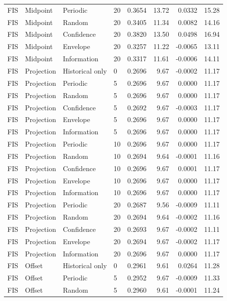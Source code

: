 \begin{longtable}{llllrrrr}
FIS & Midpoint & Periodic & 20 & 0.3654 & 13.72 & 0.0332 & 15.28 \\
FIS & Midpoint & Random & 20 & 0.3405 & 11.34 & 0.0082 & 14.16 \\
FIS & Midpoint & Confidence & 20 & 0.3820 & 13.50 & 0.0498 & 16.94 \\
FIS & Midpoint & Envelope & 20 & 0.3257 & 11.22 & -0.0065 & 13.11 \\
FIS & Midpoint & Information & 20 & 0.3317 & 11.61 & -0.0006 & 14.11 \\
FIS & Projection & Historical only & 0 & 0.2696 & 9.67 & -0.0002 & 11.17 \\
FIS & Projection & Periodic & 5 & 0.2696 & 9.67 & 0.0000 & 11.17 \\
FIS & Projection & Random & 5 & 0.2696 & 9.67 & 0.0000 & 11.17 \\
FIS & Projection & Confidence & 5 & 0.2692 & 9.67 & -0.0003 & 11.17 \\
FIS & Projection & Envelope & 5 & 0.2696 & 9.67 & 0.0000 & 11.17 \\
FIS & Projection & Information & 5 & 0.2696 & 9.67 & 0.0000 & 11.17 \\
FIS & Projection & Periodic & 10 & 0.2696 & 9.67 & 0.0000 & 11.17 \\
FIS & Projection & Random & 10 & 0.2694 & 9.64 & -0.0001 & 11.16 \\
FIS & Projection & Confidence & 10 & 0.2696 & 9.67 & 0.0001 & 11.17 \\
FIS & Projection & Envelope & 10 & 0.2696 & 9.67 & 0.0000 & 11.17 \\
FIS & Projection & Information & 10 & 0.2696 & 9.67 & 0.0000 & 11.17 \\
FIS & Projection & Periodic & 20 & 0.2687 & 9.56 & -0.0009 & 11.11 \\
FIS & Projection & Random & 20 & 0.2694 & 9.64 & -0.0002 & 11.16 \\
FIS & Projection & Confidence & 20 & 0.2693 & 9.67 & -0.0002 & 11.11 \\
FIS & Projection & Envelope & 20 & 0.2694 & 9.67 & -0.0002 & 11.17 \\
FIS & Projection & Information & 20 & 0.2696 & 9.67 & 0.0000 & 11.17 \\
FIS & Offset & Historical only & 0 & 0.2961 & 9.61 & 0.0264 & 11.28 \\
FIS & Offset & Periodic & 5 & 0.2952 & 9.67 & -0.0009 & 11.33 \\
FIS & Offset & Random & 5 & 0.2960 & 9.61 & -0.0001 & 11.24 \\

\end{longtable}
